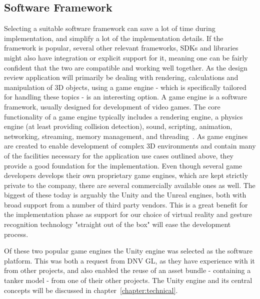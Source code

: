\subsection{Software Framework}
Selecting a suitable software framework can save a lot of time during implementation, and simplify a lot of the implementation details. 
If the framework is popular, several other relevant frameworks, SDKs and libraries might also have integration or explicit support for it, 
meaning one can be fairly confident that the two are compatible and working well together. 
As the design review application will primarily be dealing with rendering, calculations and manipulation of 3D objects, using a game engine - which is specifically tailored for handling
these topics - is an interesting option.
A game engine is a software framework, usually designed for development of video games. 
The core functionality of a game engine typically includes a rendering engine, a physics engine (at least providing collision detection), sound, scripting, 
animation, networking, streaming, memory management, and threading~\citep{Gregory2014}. As game engines are created to enable development of complex 
3D environments and contain many of the facilities necessary for the application use cases outlined above, they provide a good foundation for the implementation.
Even though several game developers develops their own proprietary game engines, which are kept strictly private to the company, there are several commercially available ones 
as well. The biggest of these today is arguably the Unity and the Unreal engines, both with broad support from a number of third party vendors. 
This is a great benefit for the implementation phase as support for our choice of virtual reality and gesture recognition technology "straight out of the box" 
will ease the development process.

Of these two popular game engines the Unity engine was selected as the software platform. This was both a request from DNV GL, 
as they have experience with it from other projects, and also enabled the reuse of an asset bundle - containing a tanker model - from one of their other projects.
The Unity engine and its central concepts will be discussed in chapter~\vref{chapter:technical}.

